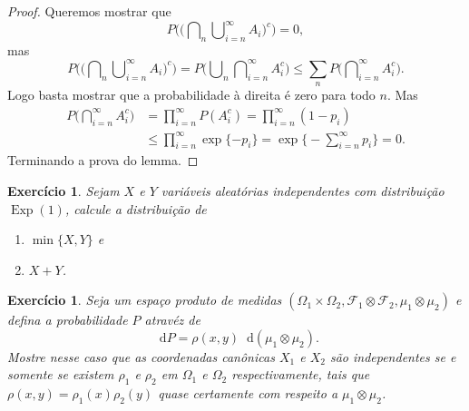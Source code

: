 \documentclass[reqno, draft]{book}
\newcommand*\1{\mathds{1}}
\newtheorem{exercise}[example]{Exercício}
\DeclareMathOperator{\Exp}{Exp}
\renewcommand*\d{\mathop{}\!\mathrm{d}}
\DeclareMathOperator*{\mcup}{{\textstyle \bigcup}}
\DeclareMathOperator*{\mcap}{{\textstyle \bigcap}}
\begin{document}
\begin{proof}
  Queremos mostrar que
  \begin{equation}
    P \Big( \big(\mcap_n \mcup_{i=n}^\infty A_i\big)^c \Big) = 0,
  \end{equation}
  mas
  \begin{equation}
    P \Big( \big(\mcap_n \mcup_{i=n}^\infty A_i\big)^c \Big) = P \Big(\mcup_n \mcap_{i=n}^\infty A_i^c \Big) \leq \sum\limits_n P \Big(\mcap_{i=n}^\infty A_i^c \Big).
  \end{equation}
  Logo basta mostrar que a probabilidade à direita é zero para todo $n$.
  Mas
  \begin{equation}
    \begin{split}
      P \Big(\mcap_{i=n}^\infty A_i^c \Big) & = \prod\limits_{i=n}^\infty P(A_i^c) = \prod\limits_{i=n}^\infty (1 - p_i)\\
      & \leq \prod\limits_{i=n}^\infty \exp\{-p_i\} = \exp\big\{- \sum_{i=n}^\infty p_i\big\} = 0.
    \end{split}
  \end{equation}
  Terminando a prova do lemma.
\end{proof}

\begin{exercise}
  Sejam $X$ e $Y$ variáveis aleatórias independentes com distribuição $\Exp(1)$, calcule a distribuição de
  \begin{enumerate}[\quad a)]
  \item $\min\{X,Y\}$ e
  \item $X + Y$.
  \end{enumerate}
\end{exercise}

\begin{exercise}
  Seja um espaço produto de medidas $(\Omega_1 \times \Omega_2, \mathcal{F}_1 \otimes \mathcal{F}_2, \mu_1 \otimes \mu_2)$ e defina a probabilidade $P$ atravéz de
  \begin{equation}
    \d P = \rho(x,y) \d (\mu_1 \otimes \mu_2).
  \end{equation}
  Mostre nesse caso que as coordenadas canônicas $X_1$ e $X_2$ são independentes se e somente se existem $\rho_1$ e $\rho_2$ em $\Omega_1$ e $\Omega_2$ respectivamente, tais que $\rho(x,y) = \rho_1(x) \rho_2(y)$ quase certamente com respeito a $\mu_1 \otimes \mu_2$.
\end{exercise}
\end{document}
